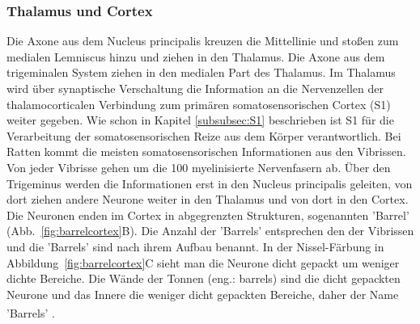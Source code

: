 \documentclass[12pt,a4paper,pdftex]{article}
\begin{document}
\subsubsection*{Thalamus und Cortex}
Die Axone aus dem Nucleus principalis kreuzen die Mittellinie und stoßen zum medialen Lemniscus hinzu und ziehen in den Thalamus. Die Axone aus dem trigeminalen System ziehen in den medialen Part des Thalamus. Im Thalamus wird über synaptische Verschaltung die Information an die Nervenzellen der thalamocorticalen Verbindung zum primären somatosensorischen Cortex (S1) weiter gegeben. 
Wie schon in Kapitel \ref{subsubsec:S1} beschrieben ist S1 für die Verarbeitung der somatosensorischen Reize aus dem Körper verantwortlich. Bei Ratten kommt die meisten somatosensorischen Informationen aus den Vibrissen. Von jeder Vibrisse gehen um die 100 myelinisierte Nervenfasern ab. Über den Trigeminus werden die Informationen erst in den Nucleus principalis geleiten, von dort ziehen andere Neurone weiter in den Thalamus und von dort in den Cortex. Die Neuronen enden im Cortex  in abgegrenzten Strukturen, sogenannten 'Barrel' (Abb.~\ref{fig:barrelcortex}B). Die Anzahl der 'Barrels' entsprechen den der Vibrissen und die 'Barrels' sind nach ihrem Aufbau benannt. In der Nissel-Färbung in Abbildung~\ref{fig:barrelcortex}C sieht man die Neurone dicht gepackt um weniger dichte Bereiche. Die Wände der Tonnen (eng.: barrels) sind die dicht gepackten Neurone und das Innere die weniger dicht gepackten Bereiche, daher der Name 'Barrels' \textsuperscript{\cite[8]{smith2008biology}}. 
\end{document}
